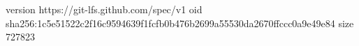version https://git-lfs.github.com/spec/v1
oid sha256:1c5e51522c2f16c9594639f1fcfb0b476b2699a55530da2670ffccc0a9e49e84
size 727823
